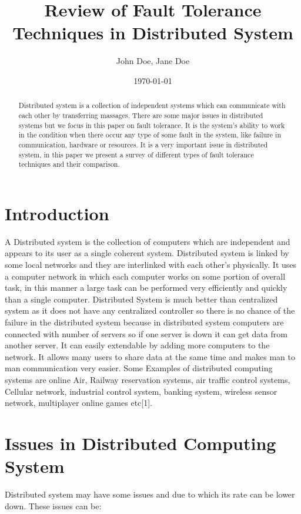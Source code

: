\documentclass{article}
\title{Review of Fault Tolerance Techniques in Distributed System}
\author{John Doe, Jane Doe}
\date{\today}
\begin{document}
\maketitle

\begin{abstract}
Distributed system is a collection of independent systems which can communicate with each other by transferring massages. There are some major issues in distributed systems but we focus in this paper on fault tolerance. It is the system’s ability to work in the condition when there occur any type of some fault in the system, like failure in communication, hardware or resources. It is a very important issue in distributed system, in this paper we present a survey of different types of fault tolerance techniques and their comparison.
\end{abstract}

\section{Introduction}
A Distributed system is the collection of computers which are independent and appears to its user as a single coherent system. Distributed system is linked by some local networks and they are interlinked with each other’s physically. It uses a computer network in which each computer works on some portion of overall task, in this manner a large task can be performed very efficiently and quickly than a single computer. Distributed System is much better than centralized system as it does not have any centralized controller so there is no chance of the failure in the distributed system because in distributed system computers are connected with number of servers so if one server is down it can get data from another server. It can easily extendable by adding more computers to the network. It allows many users to share data at the same time and makes man to man communication very easier. Some Examples of distributed computing systems are online Air, Railway reservation systems, air traffic control systems, Cellular network, industrial control system, banking system, wireless sensor network, multiplayer online games etc[1].

\section{Issues in Distributed Computing System}
Distributed system may have some issues and due to which its rate can be lower down. These issues can be:
\end{document}
